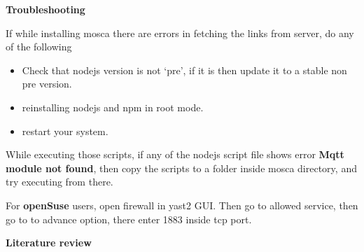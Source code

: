 \documentclass[16pt]{article}
\begin{document}
\begin{enumerate}
{\Large{\textbf{Troubleshooting}}}


If while installing mosca there are errors in fetching the links from
server, do any of the following 

\begin{itemize}

\item Check that nodejs version is not
`pre', if it is then update it to a stable non pre version.
\item reinstalling nodejs and npm in root mode. 
\item restart your system.

\end{itemize}

While executing those scripts, if any of the nodejs script file shows
error \textbf{Mqtt module not found}, then copy the scripts to a folder
inside mosca directory, and try executing from there.

For \textbf{openSuse} users, open firewall in yast2 GUI. Then go to
allowed service, then go to to advance option, there enter 1883 inside
tcp port.

  
\end{enumerate}


{\LARGE{\textbf{Literature review}}}
\vspace{0.5cm}
\end{document}
